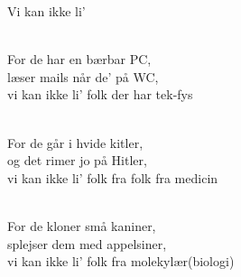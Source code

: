 \begin{song}{Vi kan ikke li'}

\begin{SBVerse}
    \\
    For de har en bærbar PC,\\
    læser mails når de' på WC,\\
    vi kan ikke li' folk der har tek-fys
 \end{SBVerse}



 \begin{SBVerse}
    \\
    For de går i hvide kitler,\\
    og det rimer jo på Hitler,\\
    vi kan ikke li' folk fra folk fra medicin
  \end{SBVerse}

 \begin{SBVerse}
    \\
    For de kloner små kaniner,\\
    splejser dem med appelsiner,\\
    vi kan ikke li' folk fra molekylær(biologi)
  \end{SBVerse}


\end{song}
